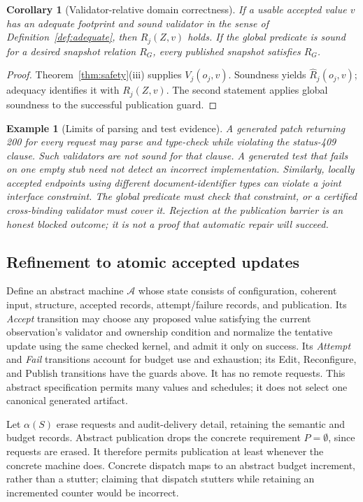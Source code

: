 \documentclass[pdflatex,sn-mathphys-num]{sn-jnl}
\theoremstyle{thmstyleone}
\newtheorem{corollary}[theorem]{Corollary}
\theoremstyle{thmstylethree}
\theoremstyle{thmstyletwo}
\newtheorem{example}{Example}
\begin{document}
\begin{corollary}[Validator-relative domain correctness]\label{cor:domain}
If a usable accepted value $v$ has an adequate footprint and sound validator in the sense of Definition~\ref{def:adequate}, then $R_j(Z,v)$ holds. If the global predicate is sound for a desired snapshot relation $R_G$, every published snapshot satisfies $R_G$.
\end{corollary}
\begin{proof}
Theorem~\ref{thm:safety}(iii) supplies $V_j(o_j,v)$. Soundness yields $\widehat R_j(o_j,v)$; adequacy identifies it with $R_j(Z,v)$. The second statement applies global soundness to the successful publication guard.\qedhere
\end{proof}

\begin{example}[Limits of parsing and test evidence]\label{ex:limits}
A generated patch returning 200 for every request may parse and type-check while violating the status-409 clause. Such validators are not sound for that clause. A generated test that fails on one empty stub need not detect an incorrect implementation. Similarly, locally accepted endpoints using different document-identifier types can violate a joint interface constraint. The global predicate must check that constraint, or a certified cross-binding validator must cover it. Rejection at the publication barrier is an honest blocked outcome; it is not a proof that automatic repair will succeed.
\end{example}

\subsection{Refinement to atomic accepted updates}
Define an abstract machine $\mathcal A$ whose state consists of configuration, coherent input, structure, accepted records, attempt/failure records, and publication. Its \emph{Accept} transition may choose any proposed value satisfying the current observation's validator and ownership condition and normalize the tentative update using the same checked kernel, and admit it only on success. Its \emph{Attempt} and \emph{Fail} transitions account for budget use and exhaustion; its Edit, Reconfigure, and Publish transitions have the guards above. It has no remote requests. This abstract specification permits many values and schedules; it does not select one canonical generated artifact.

Let $\alpha(S)$ erase requests and audit-delivery detail, retaining the semantic and budget records. Abstract publication drops the concrete requirement $P=\emptyset$, since requests are erased. It therefore permits publication at least whenever the concrete machine does. Concrete dispatch maps to an abstract budget increment, rather than a stutter; claiming that dispatch stutters while retaining an incremented counter would be incorrect.
\end{document}
